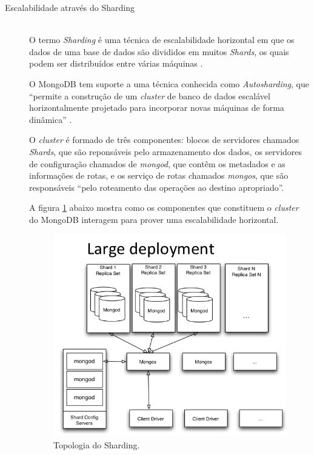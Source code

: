 \begin{description}
\item[Escalabilidade através do Sharding] \hfill \\ 
 O termo \textit{Sharding} é uma técnica de escalabilidade horizontal em que os dados de uma base de dados são divididos em muitos \textit{Shards}, os quais podem ser distribuídos entre várias máquinas \cite{AnalysisNoSQL}.

O MongoDB tem suporte a uma técnica conhecida como \textit{Autosharding}, que ``permite a construção de um \textit{cluster} de banco de dados escalável horizontalmente projetado para incorporar novas máquinas de forma dinâmica'' \cite{BdNoSQLxSGBDs}.

O \textit{cluster} é formado de três componentes: blocos de servidores chamados \textit{Shards}, que são reponsáveis pelo armazenamento dos dados, os servidores de configuração chamados de \textit{mongod}, que contêm os metadados e as informações de rotas, e os serviço de rotas chamados \textit{mongos}, que são responsáveis ``pelo roteamento das operações ao destino apropriado''\cite{BdNoSQLxSGBDs}.

A figura \ref{fig: Topologia do Sharding}  abaixo mostra como os componentes que constituem o \textit{cluster} do MongoDB interagem para prover uma escalabilidade horizontal.  
\begin{figure}[!ht]
\centering
\includegraphics[scale=0.7]{images/1sharding_topology.png}
\caption{Topologia do Sharding. \cite{MongoPy}}
\label{fig: Topologia do Sharding}
\end{figure}


\end{description}
